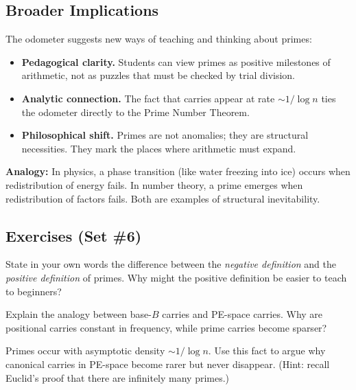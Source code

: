 \documentclass[11pt]{article}
\theoremstyle{definition}
\begin{document}
\subsection{Broader Implications}

The odometer suggests new ways of teaching and thinking about primes:

\begin{itemize}
  \item \textbf{Pedagogical clarity.}  
        Students can view primes as positive milestones of arithmetic, 
        not as puzzles that must be checked by trial division.
  \item \textbf{Analytic connection.}  
        The fact that carries appear at rate $\sim 1/\log n$ 
        ties the odometer directly to the Prime Number Theorem.
  \item \textbf{Philosophical shift.}  
        Primes are not anomalies; they are structural necessities.  
        They mark the places where arithmetic must expand.
\end{itemize}

\begin{studentnote}
\textbf{Analogy:}  
In physics, a phase transition (like water freezing into ice) 
occurs when redistribution of energy fails.  
In number theory, a prime emerges when redistribution of factors fails.  
Both are examples of structural inevitability.
\end{studentnote}

\subsection*{Exercises (Set \#6)}

\begin{studentexercise}
State in your own words the difference between the \emph{negative definition} 
and the \emph{positive definition} of primes.  
Why might the positive definition be easier to teach to beginners?
\end{studentexercise}

\begin{studentexercise}
Explain the analogy between base-$B$ carries and PE-space carries.  
Why are positional carries constant in frequency, while prime carries become sparser?
\end{studentexercise}

\begin{studentexercise}
Primes occur with asymptotic density $\sim 1 / \log n$.  
Use this fact to argue why canonical carries in PE-space become rarer but never disappear. 
(Hint: recall Euclid’s proof that there are infinitely many primes.)
\end{studentexercise}
\end{document}
